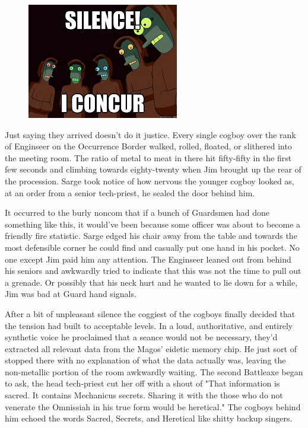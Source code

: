 \begin{figure}
	\begin{center}
		\includegraphics[width=\figwidth]{pics/11/34.png}
	\end{center}
\end{figure}
Just saying they arrived doesn't do it justice. 
Every single cogboy over the rank of Enginseer on the Occurrence Border walked, rolled, floated, or slithered into the meeting room. 
The ratio of metal to meat in there hit fifty-fifty in the first few seconds and climbing towards eighty-twenty when Jim brought up the rear of the procession. 
Sarge took notice of how nervous the younger cogboy looked as, at an order from a senior tech-priest, he sealed the door behind him. 


It occurred to the burly noncom that if a bunch of Guardsmen had done something like this, it would've been because some officer was about to become a friendly fire statistic. 
Sarge edged his chair away from the table and towards the most defensible corner he could find and casually put one hand in his pocket. 
No one except Jim paid him any attention. 
The Enginseer leaned out from behind his seniors and awkwardly tried to indicate that this was not the time to pull out a grenade. 
Or possibly that his neck hurt and he wanted to lie down for a while, Jim was bad at Guard hand signals.

After a bit of unpleasant silence the coggiest of the cogboys finally decided that the tension had built to acceptable levels. 
In a loud, authoritative, and entirely synthetic voice he proclaimed that a seance would not be necessary, they'd extracted all relevant data from the Magos' eidetic memory chip. 
He just sort of stopped there with no explanation of what the data actually was, leaving the non-metallic portion of the room awkwardly waiting. 
The second Battleaxe began to ask, the head tech-priest cut her off with a shout of "That information is sacred. 
It contains Mechanicus secrets. 
Sharing it with the those who do not venerate the Omnissiah in his true form would be heretical." The cogboys behind him echoed the words Sacred, Secrets, and Heretical like shitty backup singers.

